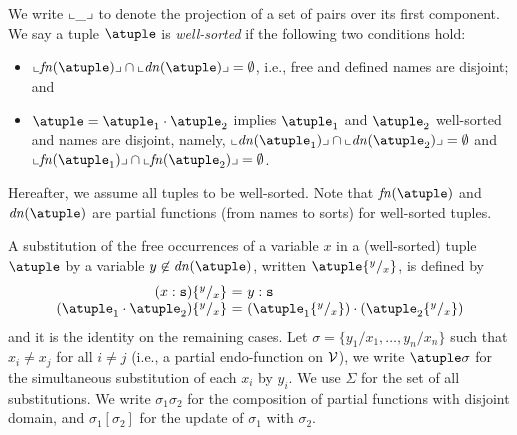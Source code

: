 We write $\llcorner\_\lrcorner$ to denote the projection of a set of pairs over its first component. 
%
We say a tuple $\atuple$ is {\em well-sorted} if the following two
conditions hold:
\begin{itemize}
\item
  $\supp{\fn\atuple} \cap \supp{\dn{\atuple}} = \emptyset$, i.e., free and
  defined names are disjoint; and
\item
  $\atuple = \atuple_1 \cdot \atuple_2$ implies $\atuple_1$ and
  $\atuple_2$ well-sorted and  names are disjoint, namely, 
  $\supp{\dn{\atuple_1}} \cap \supp{\dn{\atuple_2}} =  \emptyset$
  and 
  $\supp{\fn{\atuple_1}} \cap \supp{\fn{\atuple_2}} =  \emptyset$.
\end{itemize}
%
Hereafter, we assume all tuples to be well-sorted.
%
Note that $\fn{\atuple}$ and $\dn{\atuple}$ are partial functions (from names to sorts)
for well-sorted tuples.

A substitution of the free occurrences of a variable $x$ in a
(well-sorted) tuple $\atuple$ 
by a variable $y\not\in \dn{\atuple}$, written $\atuple \sust x y$, is
defined by
%
\[
\begin{array}{r@{}l@{\ = \ } ll}
(x  : \asort)
&
\sust x y  
&  
y : \asort
\\
(\atuple_1 \cdot \atuple_2)
&
\sust x y  
& 
(\atuple_1\sust x y) \cdot (\atuple_2\sust x y) 
\end{array}
\]
%
and it is the identity on the remaining cases. Let
$\sigma = \{y_1/x_1,\ldots,y_n/x_n\}$ such that $x_i\neq x_j$ for all
$i\neq j$ (i.e., a partial endo-function on $\mathcal{V}$), we write
$\atuple\sigma$ for the simultaneous substitution of each $x_i$ by
$y_i$.
%
We use $\Sigma$ for the set of all substitutions. We write
$\sigma_1\sigma_2$ for the composition of partial functions with
disjoint domain, and $\sigma_1[\sigma_2]$ for the update of $\sigma_1$
with $\sigma_2$.


